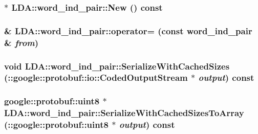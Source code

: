 \label{class_l_d_a_1_1word__ind__pair_afdcfa1f1e319fbc394c671ad94eb4f09}
\hypertarget{class_l_d_a_1_1word__ind__pair_accd0fc3a7fc345b04d25f4c806985835}{
\subsubsection[{New}]{ $\ast$ LDA::word\_\-ind\_\-pair::New () const}}
\label{class_l_d_a_1_1word__ind__pair_accd0fc3a7fc345b04d25f4c806985835}
\hypertarget{class_l_d_a_1_1word__ind__pair_a3a0db936ddaf2105165f00b0594a76e1}{
\subsubsection[{operator=}]{\& LDA::word\_\-ind\_\-pair::operator= (const {\bf word\_\-ind\_\-pair} \& {\em from})}}
\label{class_l_d_a_1_1word__ind__pair_a3a0db936ddaf2105165f00b0594a76e1}
\hypertarget{class_l_d_a_1_1word__ind__pair_ab6d861e57836e3177369b14cca855c77}{
\subsubsection[{SerializeWithCachedSizes}]{\setlength{\rightskip}{0pt plus 5cm}void LDA::word\_\-ind\_\-pair::SerializeWithCachedSizes (::google::protobuf::io::CodedOutputStream $\ast$ {\em output}) const}}
\label{class_l_d_a_1_1word__ind__pair_ab6d861e57836e3177369b14cca855c77}
\hypertarget{class_l_d_a_1_1word__ind__pair_a8efc628f46d368ee24f5ca74fcb7993d}{
\subsubsection[{SerializeWithCachedSizesToArray}]{\setlength{\rightskip}{0pt plus 5cm}google::protobuf::uint8 $\ast$ LDA::word\_\-ind\_\-pair::SerializeWithCachedSizesToArray (::google::protobuf::uint8 $\ast$ {\em output}) const}}
